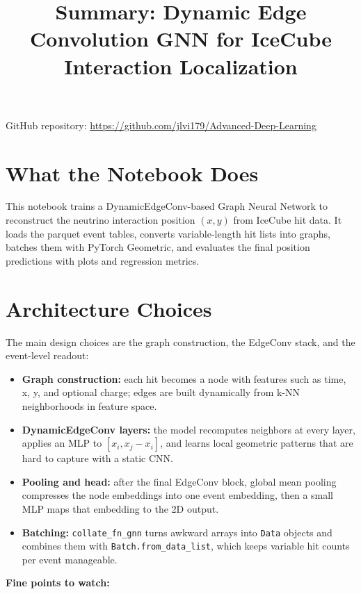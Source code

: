 \documentclass[11pt,a4paper]{article}
\title{Summary: Dynamic Edge Convolution GNN for IceCube Interaction Localization}
\author{}
\date{}
\begin{document}
\maketitle

\noindent GitHub repository: \href{https://github.com/jlvi179/Advanced-Deep-Learning}{https://github.com/jlvi179/Advanced-Deep-Learning}

\section*{What the Notebook Does}

This notebook trains a DynamicEdgeConv-based Graph Neural Network to reconstruct the neutrino interaction position $(x,y)$ from IceCube hit data. It loads the parquet event tables, converts variable-length hit lists into graphs, batches them with PyTorch Geometric, and evaluates the final position predictions with plots and regression metrics.

\section*{Architecture Choices}

The main design choices are the graph construction, the EdgeConv stack, and the event-level readout:

\begin{itemize}
    \item \textbf{Graph construction:} each hit becomes a node with features such as time, x, y, and optional charge; edges are built dynamically from k-NN neighborhoods in feature space.
    \item \textbf{DynamicEdgeConv layers:} the model recomputes neighbors at every layer, applies an MLP to $[x_i, x_j - x_i]$, and learns local geometric patterns that are hard to capture with a static CNN.
    \item \textbf{Pooling and head:} after the final EdgeConv block, global mean pooling compresses the node embeddings into one event embedding, then a small MLP maps that embedding to the 2D output.
    \item \textbf{Batching:} \texttt{collate\_fn\_gnn} turns awkward arrays into \texttt{Data} objects and combines them with \texttt{Batch.from\_data\_list}, which keeps variable hit counts per event manageable.
\end{itemize}

\textbf{Fine points to watch:}
\end{document}
